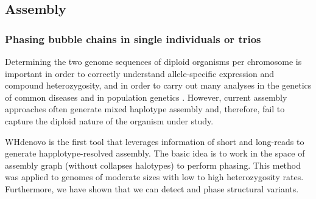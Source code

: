%

\subsection{Assembly}

\subsubsection{Phasing bubble chains in single individuals or trios}

Determining the two genome sequences of diploid organisms per chromosome is important in order to correctly understand allele-specific expression and compound heterozygosity, and in order to carry out many analyses in the genetics of common diseases and in population genetics \cite{tewhey2011importance}. 
However, current assembly approaches often generate mixed haplotype assembly and, therefore, fail to capture the diploid nature of the organism under study. 

WHdenovo \cite{garg2019trio, garg2018graph} is the first tool that leverages information of short and long-reads to generate happlotype-resolved assembly. 
The basic idea is to work in the space of assembly graph (without collapses halotypes) to perform phasing. 
This method was applied to genomes of moderate sizes with low to high heterozygosity rates. 
Furthermore, we have shown that we can detect and phase structural variants.

